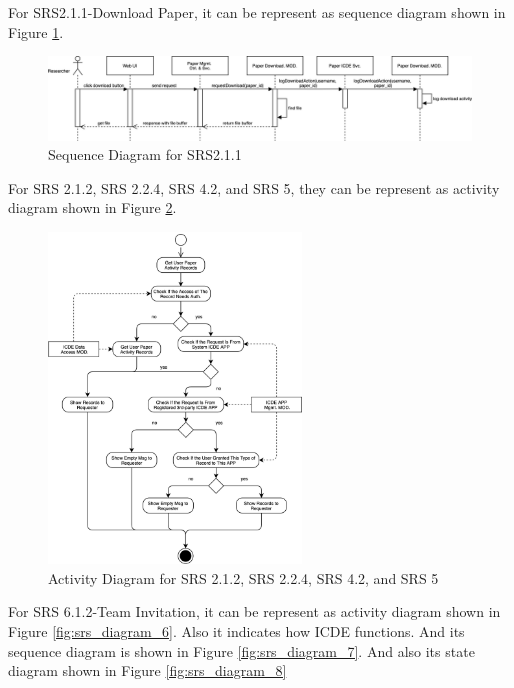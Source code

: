 For SRS2.1.1-Download Paper, it can be represent as sequence diagram shown in Figure \ref{fig:srs_diagram_4}.

\begin{figure}[t]
	\centering
	\includegraphics[width=1\textwidth]{./img/srs_diagram_4.png}
	\caption{Sequence Diagram for SRS2.1.1}
	
	\label{fig:srs_diagram_4}
\end{figure}


For SRS 2.1.2, SRS 2.2.4, SRS 4.2, and SRS 5, they can be represent as activity diagram shown in Figure \ref{fig:srs_diagram_5}.

\begin{figure}[t]
	\centering
	\includegraphics[width=0.6\textwidth]{./img/srs_diagram_5.png}
	\caption{Activity Diagram for SRS 2.1.2, SRS 2.2.4, SRS 4.2, and SRS 5}
	
	\label{fig:srs_diagram_5}
\end{figure}

For SRS 6.1.2-Team Invitation, it can be represent as activity diagram shown in Figure \ref{fig:srs_diagram_6}. 
Also it indicates how ICDE functions. And its sequence diagram is shown in Figure \ref{fig:srs_diagram_7}. 
And also its state diagram shown in Figure \ref{fig:srs_diagram_8}

